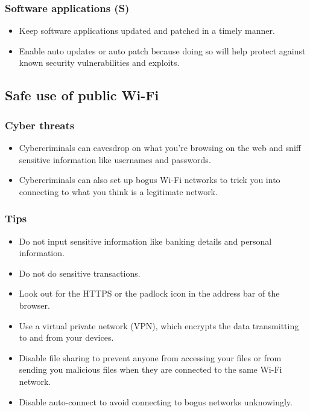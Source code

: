 \documentclass[11pt]{article}
\begin{document}
\subsubsection{Software applications (S)}
\label{sec:orge99a41c}
\begin{itemize}
\item Keep software applications updated and patched in a timely manner.
\item Enable auto updates or auto patch because doing so will help protect against known security vulnerabilities and exploits.
\end{itemize}

 \newpage

\subsection{Safe use of public Wi-Fi}
\label{sec:org9b17298}

\subsubsection{Cyber threats}
\label{sec:org71a8036}
\begin{itemize}
\item Cybercriminals can eavesdrop on what you're browsing on the web and sniff sensitive information like usernames and passwords.
\item Cybercriminals can also set up bogus Wi-Fi networks to trick you into connecting to what you think is a legitimate network.
\end{itemize}

\subsubsection{Tips}
\label{sec:org3b5abbd}
\begin{itemize}
\item Do not input sensitive information like banking details and personal information.
\item Do not do sensitive transactions.
\item Look out for the HTTPS or the padlock icon in the address bar of the browser.
\item Use a virtual private network (VPN), which encrypts the data transmitting to and from your devices.
\item Disable file sharing to prevent anyone from accessing your files or from sending you malicious files when they are connected to the same Wi-Fi network.
\item Disable auto-connect to avoid connecting to bogus networks unknowingly.
\end{itemize}
\end{document}

